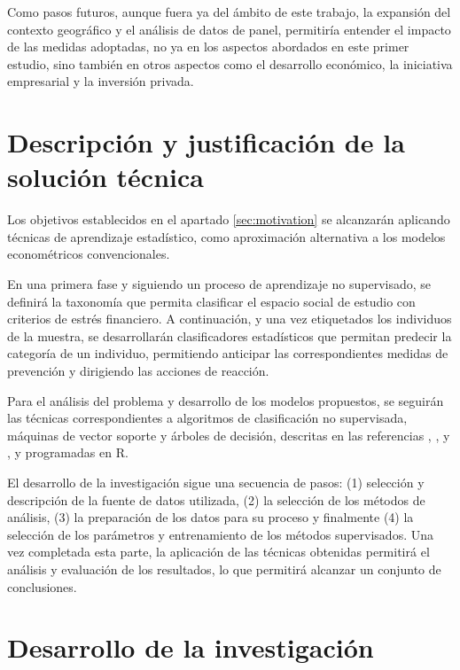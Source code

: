 \documentclass[a4paper, 11pt]{article}
\begin{document}
Como pasos futuros, aunque fuera ya del ámbito de este trabajo, la expansión del contexto
geográfico y el análisis de datos de panel, permitiría entender el impacto de las medidas 
adoptadas, no ya en los aspectos abordados en este primer estudio, sino también en otros 
aspectos como el desarrollo económico, la iniciativa empresarial y la inversión privada. 

\section{Descripción y justificación de la solución técnica}
\label{sec:technical_proposal}
Los objetivos establecidos en el apartado \ref{sec:motivation} se alcanzarán aplicando técnicas 
de aprendizaje estadístico, como aproximación alternativa a los modelos econométricos 
convencionales. 

En una primera fase y siguiendo un proceso de aprendizaje no supervisado, se definirá la taxonomía que permita clasificar el espacio social de estudio con criterios de estrés
financiero. A continuación, y una vez etiquetados los individuos de la muestra, se
desarrollarán clasificadores estadísticos que permitan predecir la categoría de un 
individuo, permitiendo anticipar las correspondientes medidas de prevención y dirigiendo las 
acciones de reacción. 

Para el análisis del problema y desarrollo de los modelos propuestos, se seguirán las 
técnicas correspondientes a algoritmos de clasificación no supervisada, máquinas de vector 
soporte y árboles de decisión, descritas en las referencias \cite{lantz23}, \cite{Hastie23}, 
\cite{aurelien17} y \cite{Hastie13}, y programadas en R\cite{R24}.

El desarrollo de la investigación sigue una secuencia de pasos: (1) selección y descripción 
de la fuente de datos utilizada, (2) la selección de los métodos de análisis, (3) la 
preparación de los datos para su proceso y finalmente (4) la selección de los parámetros y 
entrenamiento de los métodos supervisados. Una vez completada esta parte, la aplicación de
las técnicas obtenidas permitirá el análisis y evaluación de los resultados, lo que permitirá
alcanzar un conjunto de conclusiones.

\section{Desarrollo de la investigación}
\label{sec:research}
\end{document}
